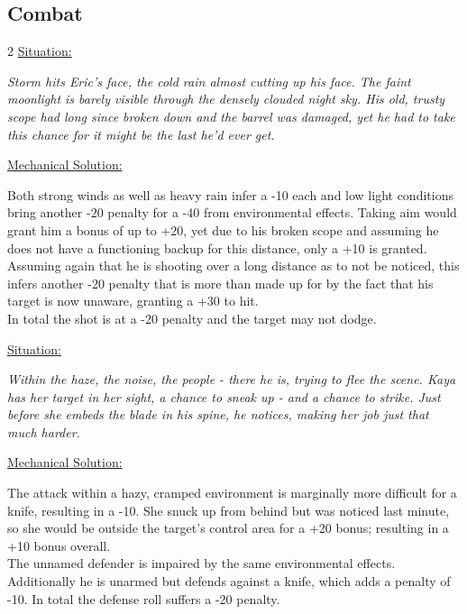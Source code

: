 \subsection*{Combat}
\vspace{4mm}
\begin{multicols}{2}
	\ul{Situation:}
	\begin{exampleblock}
		\itshape
		Storm hits Eric’s face, the cold rain almost cutting up his face.
		The faint moonlight is barely visible through the densely clouded night sky.
		His old, trusty scope had long since broken down and the barrel was damaged,
			yet he had to take this chance for it might be the last he’d ever get.
	\end{exampleblock}
	\columnbreak
	\ul{Mechanical Solution:}
	\begin{exampleblock}
		Both strong winds as well as heavy rain infer a -10 each and low light conditions bring another -20 penalty for a -40 from environmental effects. Taking aim would grant him a bonus of up to +20, yet due to his broken scope and assuming he does not have a functioning backup for this distance, only a +10 is granted. Assuming again that he is shooting over a long distance as to not be noticed, this infers another -20 penalty that is more than made up for by the fact that his target is now unaware, granting a +30 to hit.\\
		In total the shot is at a -20 penalty and the target may not dodge.
	\end{exampleblock}
	\columnbreak
	\ul{Situation:}
	\begin{exampleblock}
		\itshape
		Within the haze, the noise, the people
			- there he is, trying to flee the scene.
		Kaya has her target in her sight, a chance to sneak up
			- and a chance to strike.
		Just before she embeds the blade in his spine,
			he notices, making her job just that much harder.
	\end{exampleblock}
	\columnbreak
	\ul{Mechanical Solution:}
	\begin{exampleblock}
		The attack within a hazy, cramped environment is marginally more difficult for a knife, resulting in a -10.
		She snuck up from behind but was noticed last minute,
			so she would be outside the target's control area for a +20 bonus;
		resulting in a +10 bonus overall.\\
		The unnamed defender is impaired by the same environmental effects.
		Additionally he is unarmed but defends against a knife, which adds a penalty of -10.
		In total the defense roll suffers a -20 penalty.
	\end{exampleblock}
\end{multicols}

